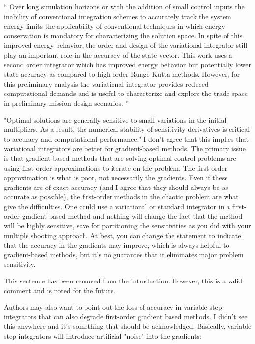 \documentclass[11pt]{article}
\newenvironment{correction}{\begin{list}{}{\setlength{\leftmargin}{1cm}\setlength{\rightmargin}{1cm}}\vspace{\parsep}\item[]``}{''\end{list}}
\begin{document}
\begin{enumerate}
\begin{correction}
Over long simulation horizons or with the addition of small control inputs the inability of conventional integration schemes to accurately track the system energy limits the applicability of conventional techniques in which energy conservation is mandatory for characterizing the solution space.
In spite of this improved energy behavior, the order and design of the variational integrator still play an important role in the accuracy of the state vector.
This work uses a second order integrator which has improved energy behavior but potentially lower state accuracy as compared to high order Runge Kutta methods. 
However, for this preliminary analysis the variational integrator provides reduced computational demands and is useful to characterize and explore the trade space in preliminary mission design scenarios.
\end{correction}
\item 
    \begin{itshape}
"Optimal solutions are generally sensitive to small variations in the initial multipliers. As a result, the numerical stability of sensitivity derivatives is critical to accuracy and computational performance."  I don't agree that this implies that variational integrators are better for gradient-based methods.  The primary issue is that gradient-based methods that are solving optimal control problems are using first-order approximations to iterate on the problem.  The first-order approximation is what is poor, not necessarily the gradients.  Even if these gradients are of exact accuracy (and I agree that they should always be as accurate as possible), the first-order methods in the chaotic problem are what give the difficulties.  One could use a variational or standard integrator in a first-order gradient based method and nothing will change the fact that the method will be highly sensitive, save for partitioning the sensitivities as you did with your multiple shooting approach.  At best, you can change the statement to indicate that the accuracy in the gradients may improve, which is always helpful to gradient-based methods, but it's no guarantee that it eliminates major problem sensitivity.
\end{itshape}

This sentence has been removed from the introduction.
However, this is a valid comment and is noted for the future.

\item
    \begin{itshape}
Authors may also want to point out the loss of accuracy in variable step integrators that can also degrade first-order gradient based methods.  I didn't see this anywhere and it's something that should be acknowledged.  Basically, variable step integrators will introduce artificial "noise" into the gradients:


\end{itshape}
\end{enumerate}
\end{document}
